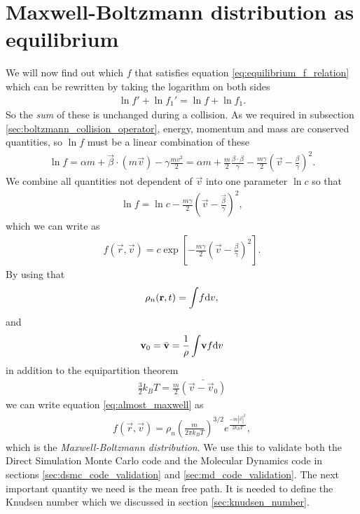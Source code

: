 \section{Maxwell-Boltzmann distribution as equilibrium}
\label{sec:maxwell_boltzmann_distribution}
We will now find out which $f$ that satisfies equation \eqref{eq:equilibrium_f_relation} which can be rewritten by taking the logarithm on both sides
\begin{align}
	\ln f' + \ln f_1' = \ln f + \ln f_1.
\end{align}
So the \textit{sum} of these is unchanged during a collision. As we required in subsection \ref{sec:boltzmann_collision_operator}, energy, momentum and mass are conserved quantities, so $\ln f$ must be a linear combination of these
\begin{align}
	\ln f = \alpha m + \vec \beta\cdot(m\vec v) - \gamma\frac{mv^2}{2} = \alpha m + \frac{m}{2}\frac{\beta\cdot\beta}{\gamma} - \frac{m\gamma}{2}\left(\vec v - \frac{\beta}{\gamma}\right)^2.
\end{align}
We combine all quantities not dependent of $\vec v$ into one parameter $\ln c$ so that
\begin{align}
	\ln f = \ln c - \frac{m\gamma}{2}\left(\vec v - \frac{\vec \beta}{\gamma}\right)^2,
\end{align}
which we can write as
\begin{align}
	\label{eq:almost_maxwell}
	f(\vec r, \vec v) = c\exp\left[-\frac{m\gamma}{2}\left(\vec v - \frac{\beta}{\gamma}\right)^2\right].
\end{align}
By using that 
\begin{align}
	\rho_n(\mathbf r, t) = \int\!f\mathrm{d}v,
\end{align}
and 
\begin{align}
	\mathbf v_0 = \bar {\mathbf v} = \frac{1}{\rho}\int\!\mathbf v f\mathrm{d}v
\end{align}
in addition to the equipartition theorem
\begin{align}
	\frac{3}{2}k_B T = \frac{m}{2}\bar{(\vec v - \vec v_0)}
\end{align}
we can write equation \eqref{eq:almost_maxwell} as \cite{mclennan1989introduction}
\begin{align}
	\label{eq:maxwell_boltzmann_distribution}
	f(\vec r, \vec v) = \rho_n \left(\frac{m}{2\pi k_B T}\right)^{3/2}e^\frac{-m|\vec v|^2}{2k_BT},
\end{align}
which is the \textit{Maxwell-Boltzmann distribution}. We use this to validate both the Direct Simulation Monte Carlo code and the Molecular Dynamics code in sections \ref{sec:dsmc_code_validation} and \ref{sec:md_code_validation}. The next important quantity we need is the mean free path. It is needed to define the Knudsen number which we discussed in section \ref{sec:knudsen_number}.
